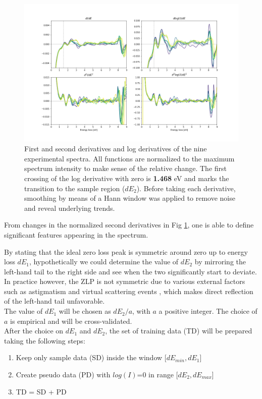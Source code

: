 \documentclass[11pt,a4paper]{article}
\numberwithin{equation}{section}
\numberwithin{figure}{section}
\numberwithin{table}{section}
\begin{document}
\begin{figure}[H]
    \centering 
    \includegraphics[width=170mm]{plots/derivatives.png}
    \caption{First and second derivatives and log derivatives of the nine experimental spectra. All functions are normalized to the maximum spectrum intensity to make sense of the relative change. The first crossing of the log derivative with zero is \textbf{1.468} eV and marks the transition to the sample region ($dE_2$). Before taking each derivative, smoothing by means of a Hann window \cite{hann} was applied to remove noise and reveal underlying trends. }
    \label{bound}
\end{figure}

From changes in the normalized second derivatives in Fig \ref{bound}, one is able to define significant features appearing in the spectrum. 

By stating that the ideal zero loss peak is symmetric around zero up to energy loss $dE_1$, hypothetically we could determine the value of $dE_2$ by mirroring the left-hand tail to the right side and see when the two significantly start to deviate. In practice however, the ZLP is not symmetric due to various external factors such as astigmatism \cite{astigma} and virtual scattering events \cite{rafferty}, which makes direct reflection of the left-hand tail unfavorable. \\
The value of $dE_1$ will be chosen as $dE_2 / a$, with $a$ a positive integer. The choice of $a$ is empirical and will be cross-validated. \\ 

After the choice on $dE_1$ and $dE_2$, the set of training data (TD) will be prepared taking the following steps:
\begin{enumerate}
    \item Keep only sample data (SD) inside the window [$dE_{min}, dE_1$]
    \item Create pseudo data (PD) with $log(I)$=0 in range [$dE_2, dE_{max}$]
    \item TD = SD + PD
\end{enumerate}
\end{document}
